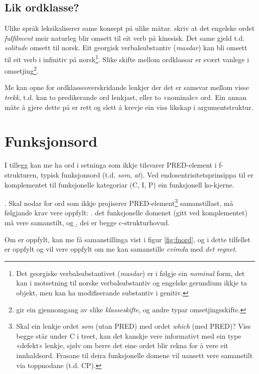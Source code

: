 \documentclass[11pt,a4paper,oneside,draft]{book}
\begin{document}
\subsection{Lik ordklasse?}
\label{sec-3.5.2}

Ulike språk leksikaliserer same konsept på ulike
måtar. \citet[s.~3]{cheung2002scg} skriv at det engelske ordet
\emph{fulfilment} meir naturleg blir omsett til eit verb på kinesisk. Det
same gjeld t.d. \emph{solitude} omsett til norsk. Eit georgisk
verbalsubstantiv (\emph{masdar}) kan bli omsett til eit verb i infinitiv på
norsk\footnote{Det georgiske verbalsubstantivet (\emph{masdar}) er i følgje
        \citet[kap.~2.5]{aronson1990grg} ein \emph{nominal} form, det kan i
        motsetning til norske verbalsubstantiv og engelske gerundium
        ikkje ta objekt, men kan ha modifiserande substantiv i
        genitiv. }. Slike skifte mellom ordklassar er svært vanlege i
omsetjing\footnote{\citet[Catford~(1965),~i][s.~61]{munday2001its} gir ein gjennomgang av
slike \emph{klasseskifte}, og andre typar omsetjingsskifte. }.

Me kan opne for ordklasseoverskridande lenkjer der det er samsvar
mellom visse \emph{trekk}, t.d. kan to predikerande ord lenkjast, eller to
«nominale» ord. Ein annan måte å gjere dette på er rett og slett å
krevje ein viss likskap i argumentstruktur. 
\section{Funksjonsord}
\label{sec-3.6}

\label{SEC:fnord}
I tillegg kan me ha ord i setninga som ikkje tilsvarer PRED-element i
f-strukturen, typisk funksjonsord (t.d. \emph{som}, \emph{at}). Ved
endosentrisitetsprinsippa til \citet{bresnan2001lfs} er komplementet
til funksjonelle kategoriar (C, I, P) ein funksjonell ko-kjerne. 

\ex. \label{fnordkrav} Skal nodar for ord som ikkje projiserer
     PRED-element\footnote{Skal ein lenkje ordet \emph{som} (utan PRED) med ordet \emph{which} (med
 PRED)? Viss begge står under C i treet, kan det kanskje vere
 informativt med ein type «defekt» lenkje, sjølv om berre det eine
 ordet blir rekna for å vere eit innhaldsord. Frasane til deira
 funksjonelle domene vil uansett vere samanstilt via toppnodane
 (t.d. CP). } samanstillast, må følgjande krav vere oppfylt:
\a. det funksjonelle domenet (gitt ved komplementet) må vere
   samanstilt, og
\b. dei er begge c-strukturhovud.


Om \Last[a og -b] er oppfylt, kan me få samanstillinga vist i figur
\ref{fig:fnord}, og i dette tilfellet er \Last[b] oppfylt og \Last[a]
vil vere oppfylt om me kan samanstille \emph{cvimda} med \emph{det regnet}.
\end{document}
